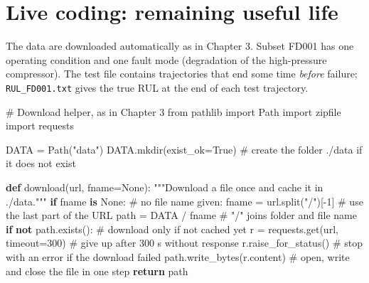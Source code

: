 \documentclass[
  letterpaper,
  DIV=11,
  numbers=noendperiod]{scrreprt}
\newenvironment{Shaded}{\begin{snugshade}}{\end{snugshade}}
\newcommand{\CommentTok}[1]{\textcolor[rgb]{0.37,0.37,0.37}{#1}}
\newcommand{\ControlFlowTok}[1]{\textcolor[rgb]{0.00,0.23,0.31}{\textbf{#1}}}
\newcommand{\DecValTok}[1]{\textcolor[rgb]{0.68,0.00,0.00}{#1}}
\newcommand{\ImportTok}[1]{\textcolor[rgb]{0.00,0.46,0.62}{#1}}
\newcommand{\KeywordTok}[1]{\textcolor[rgb]{0.00,0.23,0.31}{\textbf{#1}}}
\newcommand{\NormalTok}[1]{\textcolor[rgb]{0.00,0.23,0.31}{#1}}
\newcommand{\OperatorTok}[1]{\textcolor[rgb]{0.37,0.37,0.37}{#1}}
\newcommand{\StringTok}[1]{\textcolor[rgb]{0.13,0.47,0.30}{#1}}
\newcommand{\VariableTok}[1]{\textcolor[rgb]{0.07,0.07,0.07}{#1}}
\begin{document}
\section{Live coding: remaining useful
life}\label{live-coding-remaining-useful-life}

The data are downloaded automatically as in Chapter 3. Subset FD001 has
one operating condition and one fault mode (degradation of the
high-pressure compressor). The test file contains trajectories that end
some time \emph{before} failure; \texttt{RUL\_FD001.txt} gives the true
RUL at the end of each test trajectory.

\begin{Shaded}
\begin{Highlighting}[]
\CommentTok{\# Download helper, as in Chapter 3}
\ImportTok{from}\NormalTok{ pathlib }\ImportTok{import}\NormalTok{ Path}
\ImportTok{import}\NormalTok{ zipfile}
\ImportTok{import}\NormalTok{ requests}

\NormalTok{DATA }\OperatorTok{=}\NormalTok{ Path(}\StringTok{"data"}\NormalTok{)}
\NormalTok{DATA.mkdir(exist\_ok}\OperatorTok{=}\VariableTok{True}\NormalTok{)                         }\CommentTok{\# create the folder ./data if it does not exist}

\KeywordTok{def}\NormalTok{ download(url, fname}\OperatorTok{=}\VariableTok{None}\NormalTok{):}
    \CommentTok{"""Download a file once and cache it in ./data."""}
    \ControlFlowTok{if}\NormalTok{ fname }\KeywordTok{is} \VariableTok{None}\NormalTok{:                             }\CommentTok{\# no file name given:}
\NormalTok{        fname }\OperatorTok{=}\NormalTok{ url.split(}\StringTok{"/"}\NormalTok{)[}\OperatorTok{{-}}\DecValTok{1}\NormalTok{]                }\CommentTok{\# use the last part of the URL}
\NormalTok{    path }\OperatorTok{=}\NormalTok{ DATA }\OperatorTok{/}\NormalTok{ fname                           }\CommentTok{\# "/" joins folder and file name}
    \ControlFlowTok{if} \KeywordTok{not}\NormalTok{ path.exists():                         }\CommentTok{\# download only if not cached yet}
\NormalTok{        r }\OperatorTok{=}\NormalTok{ requests.get(url, timeout}\OperatorTok{=}\DecValTok{300}\NormalTok{)        }\CommentTok{\# give up after 300 s without response}
\NormalTok{        r.raise\_for\_status()                      }\CommentTok{\# stop with an error if the download failed}
\NormalTok{        path.write\_bytes(r.content)               }\CommentTok{\# open, write and close the file in one step}
    \ControlFlowTok{return}\NormalTok{ path}


\end{Highlighting}
\end{Shaded}
\end{document}

